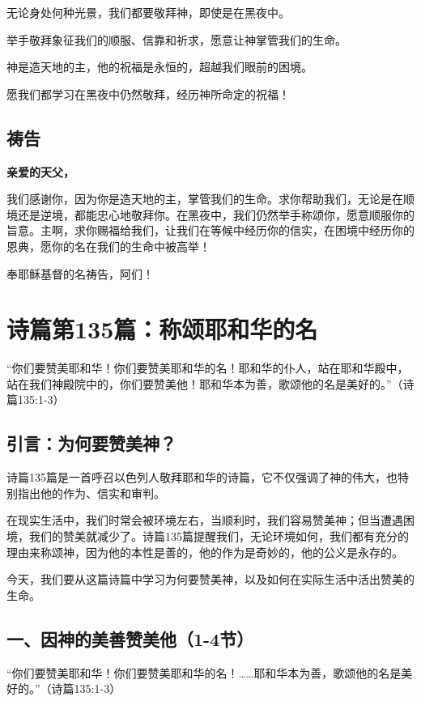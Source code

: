 \documentclass[a4paper, 12pt]{article}
\begin{document}
无论身处何种光景，我们都要敬拜神，即使是在黑夜中。

举手敬拜象征我们的顺服、信靠和祈求，愿意让神掌管我们的生命。

神是造天地的主，他的祝福是永恒的，超越我们眼前的困境。

愿我们都学习在黑夜中仍然敬拜，经历神所命定的祝福！

\subsection*{祷告}
\textbf{亲爱的天父，}

我们感谢你，因为你是造天地的主，掌管我们的生命。求你帮助我们，无论是在顺境还是逆境，都能忠心地敬拜你。在黑夜中，我们仍然举手称颂你，愿意顺服你的旨意。主啊，求你赐福给我们，让我们在等候中经历你的信实，在困境中经历你的恩典，愿你的名在我们的生命中被高举！

奉耶稣基督的名祷告，阿们！
\newpage
\section{诗篇第135篇：称颂耶和华的名}


“你们要赞美耶和华！你们要赞美耶和华的名！耶和华的仆人，站在耶和华殿中，站在我们神殿院中的，你们要赞美他！耶和华本为善，歌颂他的名是美好的。”（诗篇135:1-3）

\subsection*{引言：为何要赞美神？}
\hspace{0.6cm}诗篇135篇是一首呼召以色列人敬拜耶和华的诗篇，它不仅强调了神的伟大，也特别指出他的作为、信实和审判。

在现实生活中，我们时常会被环境左右，当顺利时，我们容易赞美神；但当遭遇困境，我们的赞美就减少了。诗篇135篇提醒我们，无论环境如何，我们都有充分的理由来称颂神，因为他的本性是善的，他的作为是奇妙的，他的公义是永存的。

今天，我们要从这篇诗篇中学习为何要赞美神，以及如何在实际生活中活出赞美的生命。

\subsection*{一、因神的美善赞美他（1-4节）}
“你们要赞美耶和华！你们要赞美耶和华的名！……耶和华本为善，歌颂他的名是美好的。”（诗篇135:1-3）
\end{document}
